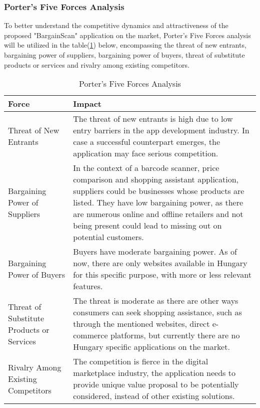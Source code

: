 \pagebreak

\subsubsection{Porter's Five Forces Analysis}

To better understand the competitive dynamics and attractiveness of the proposed "BargainScan" application on the market, Porter's Five Forces analysis will be utilized in the table(\ref{tab:pffa}) below, encompassing the threat of new entrants, bargaining power of suppliers, bargaining power of buyers, threat of substitute products or services and rivalry among existing competitors.

\begin{table}[h]
	\centering
	\begin{tabularx}{\textwidth}{|p{4cm}|X|}
		\hline
		\textbf{Force} & \textbf{Impact} \\
		\hline
		Threat of New Entrants & The threat of new entrants is high due to low entry barriers in the app development industry. In case a successful counterpart emerges, the application may face serious competition.\\
		\hline
		Bargaining Power of Suppliers & In the context of a barcode scanner, price comparison and shopping assistant application, suppliers could be businesses whose products are listed. They have low bargaining power, as there are numerous online and offline retailers and not being present could lead to missing out on potential customers. \\
		\hline
		Bargaining Power of Buyers & Buyers have moderate bargaining power. As of now, there are only websites available in Hungary for this specific purpose, with more or less relevant features. \\
		\hline
		Threat of Substitute Products or Services & The threat is moderate as there are other ways consumers can seek shopping assistance, such as through the mentioned websites, direct e-commerce platforms, but currently there are no Hungary specific applications on the market. \\
		\hline
		Rivalry Among Existing Competitors & The competition is fierce in the digital marketplace industry, the application needs to provide unique value proposal to be potentially considered, instead of other existing solutions. \\
		\hline
	\end{tabularx}
	\caption{Porter's Five Forces Analysis}
	\label{tab:pffa}
\end{table}

